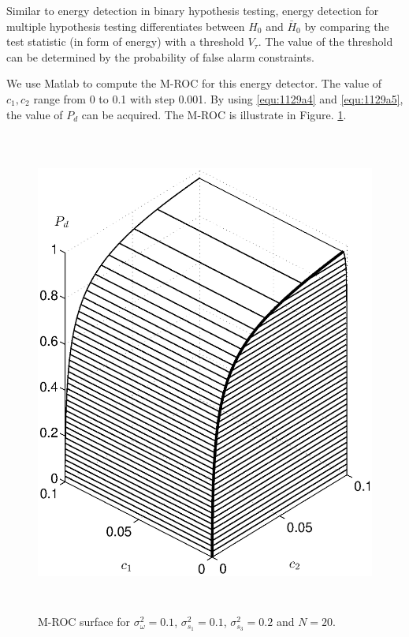 Similar to energy detection in binary hypothesis testing, energy detection for multiple hypothesis testing differentiates between $H_0$ and $\bar{H}_0$ by comparing the test statistic (in form of energy) with a threshold $V_\tau$. The value of the threshold can be determined by the probability of false alarm constraints.  

We use Matlab to compute the M-ROC for this energy detector. The value of $c_1, c_2$ range from 0 to 0.1 with step 0.001. By using \eqref{equ:1129a4} and \eqref{equ:1129a5}, the value of $P_d$ can be acquired. The M-ROC is illustrate in Figure. \ref{pic:1201a1}.  

\begin{figure}[!t]
\centering
\includegraphics[width=12cm, height=16cm]{4/energy.eps}
\caption{M-ROC surface for $\sigma_\omega^2 = 0.1$, $\sigma_{s_1}^2=0.1$, $\sigma_{s_3}^2=0.2$ and $N = 20$.}
\label{pic:1201a1}
\end{figure}

